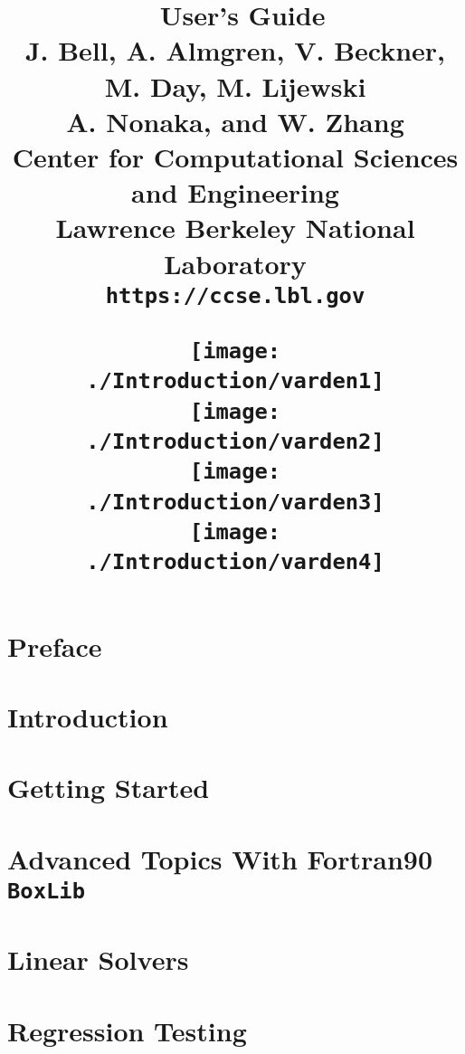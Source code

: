 \documentclass[11pt]{book}
\title{\Huge{\bf \BoxLib\ User's Guide}\\
       \vspace{0.5in}
       \Large{J. Bell, A. Almgren, V. Beckner, M. Day, M. Lijewski}\\
       \Large{A. Nonaka, and W. Zhang}\\
\vspace{0.25in}
       \Large{Center for Computational Sciences and Engineering}\\
       \Large{Lawrence Berkeley National Laboratory}\\
       \Large{\tt https://ccse.lbl.gov}
\begin{figure}[b]
\centering
\texttt{[image: ./Introduction/varden1]}
\texttt{[image: ./Introduction/varden2]}\\
\texttt{[image: ./Introduction/varden3]}
\texttt{[image: ./Introduction/varden4]}
\end{figure}
}
\makeatletter
\newcommand{\BoxLib}{{\tt BoxLib}}
\renewcommand*\cleardoublepage{\clearpage\if@twoside
\ifodd\c@page\else
\hbox{}
\thispagestyle{empty}
\newpage
\if@twocolumn\hbox{}\newpage\fi\fi\fi}
\makeatother
\begin{document}
\frontmatter

\maketitle

\cleardoublepage

\setcounter{tocdepth}{1}
\tableofcontents

\cleardoublepage


\cleardoublepage

\chapter*{Preface}


\mainmatter

\chapter{Introduction}\label{Chap:Introduction}


\chapter{Getting Started}\label{Chap:Getting Started}


\chapter{Advanced Topics With Fortran90 \BoxLib}\label{Chap:Advanced Topics F}


\chapter{Linear Solvers}\label{Chap:Linear Solvers}


\chapter{Regression Testing}\label{Chap:Regression Testing}


%
\end{document}
